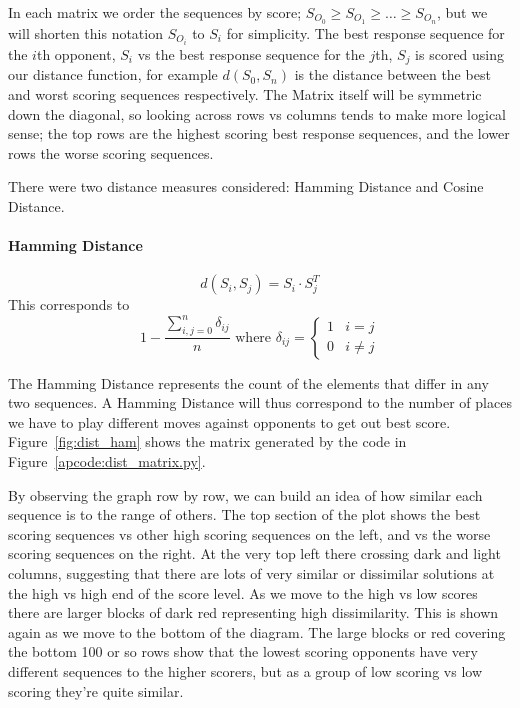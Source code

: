 In each matrix we order the sequences by score; $S_{O_0}\ge S_{O_1} \ge \ldots \ge S_{O_n}$, but we will shorten this notation $S_{O_i}$ to $S_{i}$ for simplicity.
The best response sequence for the $i$th opponent, $S_i$ vs the best response sequence for the $j$th, $S_j$ is scored using our distance function, for example $d(S_0,S_n)$ is the distance between the best and worst scoring sequences respectively.
The Matrix itself will be symmetric down the diagonal, so looking across rows vs columns tends to make more logical sense; the top rows are the highest scoring best response sequences, and the lower rows the worse scoring sequences.

There were two distance measures considered: Hamming Distance and Cosine Distance.

\paragraph{Hamming Distance}\cite{norouzi2012hamming}
$$d(S_i,S_j) = S_i \cdot S_j^T $$
This corresponds to 
$$ 1-\frac{\sum^n_{i,j=0}\delta_{ij}}{n}\text{ where } \delta_{ij} = \begin{cases} 
    1 & i=j \\
    0 & i\ne j 
\end{cases} $$

The Hamming Distance represents the count of the elements that differ in any two sequences. 
A Hamming Distance will thus correspond to the number of places we have to play different moves against opponents to get out best score. 
Figure~\ref{fig:dist_ham} shows the matrix generated by the code in Figure~\ref{apcode:dist_matrix.py}.

By observing the graph row by row, we can build an idea of how similar each sequence is to the range of others.
The top section of the plot shows the best scoring sequences vs other high scoring sequences on the left, and vs the worse scoring sequences on the right. 
At the very top left there crossing dark and light columns, suggesting that there are lots of very similar or dissimilar solutions at the high vs high end of the score level.
As we move to  the high vs low scores there are larger blocks of dark red representing high dissimilarity.
This is shown again as we move to the bottom of the diagram.
The large blocks or red covering the bottom 100 or so rows show that the lowest scoring opponents have very different sequences to the higher scorers, but as a group of low scoring vs low scoring they're quite similar.


